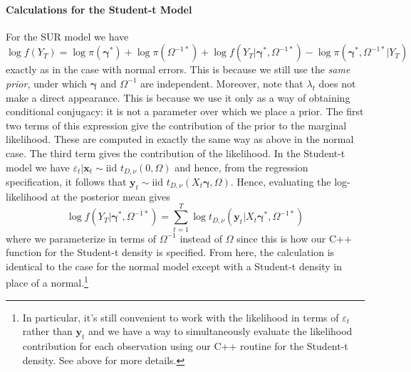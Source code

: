 \documentclass[12pt]{article}
\begin{document}
\paragraph{Calculations for the Student-t Model}
For the SUR model we have
\begin{equation*}
\log f(Y_T) = \log \pi(\boldsymbol{\gamma}^*) + \log \pi(\Omega^{-1*}) + \log f(Y_T|\boldsymbol{\gamma}^*, \Omega^{-1*}) - \log \pi(\boldsymbol{\gamma}^*, \Omega^{-1*}|Y_T)
\end{equation*}
exactly as in the case with normal errors.
This is because we still use the \emph{same prior}, under which $\boldsymbol{\gamma}$ and $\Omega^{-1}$ are independent.
Moreover, note that $\lambda_t$ does not make a direct appearance.
This is because we use it only as a way of obtaining conditional conjugacy: it is not a parameter over which we place a prior.
The first two terms of this expression give the contribution of the prior to the marginal likelihood.
These are computed in exactly the same way as above in the normal case.
The third term gives the contribution of the likelihood.
In the Student-t model we have $\varepsilon_{t}|\mathbf{x}_t \sim \mbox{iid } t_{D,\nu}(0, \Omega)$ and hence, from the regression specification, it follows that $\mathbf{y}_t \sim \mbox{iid } t_{D,\nu}(X_t \boldsymbol{\gamma},\Omega)$.
Hence, evaluating the log-likelihood at the posterior mean gives
\begin{equation*}
\log f(Y_T| \boldsymbol{\gamma}^*,\Omega^{-1*}) = \sum_{t=1}^{T} \log{ t_{D,\nu} \left(\mathbf{y}_t|X_t \boldsymbol{\gamma}^*, \Omega^{-1*}\right)}
\end{equation*}
where we parameterize in terms of $\Omega^{-1}$ instead of $\Omega$ since this is how our C++ function for the Student-t density is specified.
From here, the calculation is identical to the case for the normal model except with a Student-t density in place of a normal.\footnote{In particular, it's still convenient to work with the likelihood in terms of $\varepsilon_t$ rather than $\mathbf{y}_t$ and we have a way to simultaneously evaluate the likelihood contribution for each observation using our C++ routine for the Student-t density. See above for more details.}
\end{document}
